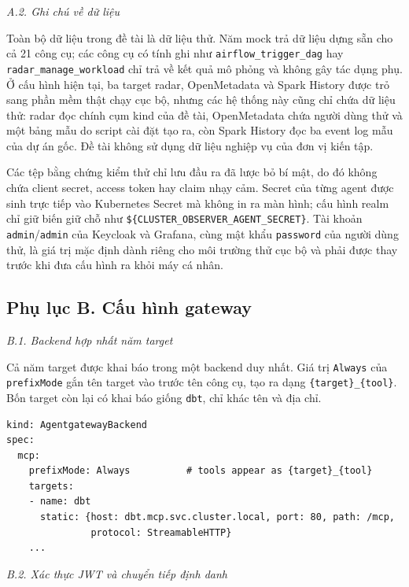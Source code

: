 \textit{A.2. Ghi chú về dữ liệu}

Toàn bộ dữ liệu trong đề tài là dữ liệu thử. Năm mock trả dữ liệu dựng sẵn cho cả 21 công cụ; các công cụ có tính ghi như \texttt{airflow\_trigger\_dag} hay \texttt{radar\_manage\_workload} chỉ trả về kết quả mô phỏng và không gây tác dụng phụ. Ở cấu hình hiện tại, ba target radar, OpenMetadata và Spark History được trỏ sang phần mềm thật chạy cục bộ, nhưng các hệ thống này cũng chỉ chứa dữ liệu thử: radar đọc chính cụm kind của đề tài, OpenMetadata chứa người dùng thử và một bảng mẫu do script cài đặt tạo ra, còn Spark History đọc ba event log mẫu của dự án gốc. Đề tài không sử dụng dữ liệu nghiệp vụ của đơn vị kiến tập.

Các tệp bằng chứng kiểm thử chỉ lưu đầu ra đã lược bỏ bí mật, do đó không chứa client secret, access token hay claim nhạy cảm. Secret của từng agent được sinh trực tiếp vào Kubernetes Secret mà không in ra màn hình; cấu hình realm chỉ giữ biến giữ chỗ như \texttt{\$\{CLUSTER\_OBSERVER\_AGENT\_SECRET\}}. Tài khoản \texttt{admin}/\texttt{admin} của Keycloak và Grafana, cùng mật khẩu \texttt{password} của người dùng thử, là giá trị mặc định dành riêng cho môi trường thử cục bộ và phải được thay trước khi đưa cấu hình ra khỏi máy cá nhân.

\subsection*{Phụ lục B. Cấu hình gateway}
\textit{B.1. Backend hợp nhất năm target}

Cả năm target được khai báo trong một backend duy nhất. Giá trị \texttt{Always} của \texttt{prefixMode} gắn tên target vào trước tên công cụ, tạo ra dạng \texttt{\{target\}\_\{tool\}}. Bốn target còn lại có khai báo giống \texttt{dbt}, chỉ khác tên và địa chỉ.
\begin{lstlisting}
kind: AgentgatewayBackend
spec:
  mcp:
    prefixMode: Always          # tools appear as {target}_{tool}
    targets:
    - name: dbt
      static: {host: dbt.mcp.svc.cluster.local, port: 80, path: /mcp,
               protocol: StreamableHTTP}
    ...
\end{lstlisting}
\textit{B.2. Xác thực JWT và chuyển tiếp định danh}

